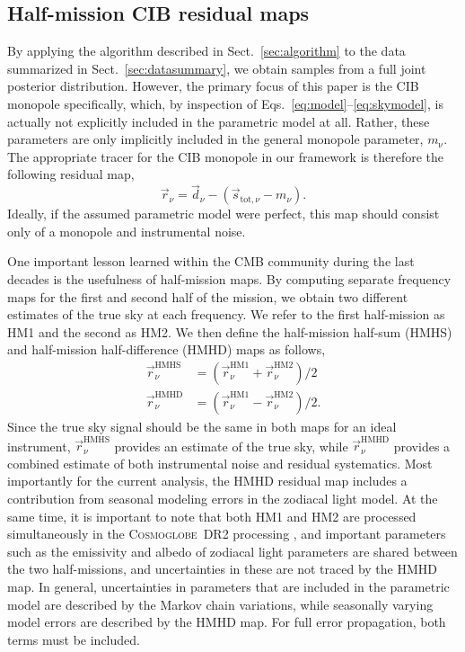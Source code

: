 \documentclass{aa}
\newcommand{\dv}[0]{\vec{d}}
\newcommand{\s}[0]{\vec{s}}
\renewcommand{\r}[0]{\vec{r}}
\newcommand{\cosmoglobe}{\textsc{Cosmoglobe}}
\begin{document}
\subsection{Half-mission CIB residual maps}

By applying the algorithm described in Sect.~\ref{sec:algorithm} to
the data summarized in Sect.~\ref{sec:datasummary}, we obtain samples
from a full joint posterior distribution. However, the primary focus
of this paper is the CIB monopole specifically, which, by inspection
of Eqs.~\eqref{eq:model}--\eqref{eq:skymodel}, is actually not
explicitly included in the parametric model at all. Rather, these
parameters are only implicitly included in the general monopole
parameter, $m_{\mathrm{\nu}}$. The appropriate tracer for the CIB
monopole in our framework is therefore the following residual map,
\begin{equation}
\r_{\nu} = \dv_{\nu} - \left(\s_{\mathrm{tot},\nu} - m_{\nu}\right).
\end{equation}
Ideally, if the assumed parametric model were perfect, this map should
consist only of a monopole and instrumental noise.

One important lesson learned within the CMB community during the last
decades is the usefulness of half-mission maps. By computing separate
frequency maps for the first and second half of the mission, we obtain
two different estimates of the true sky at each frequency. We
refer to the first half-mission as HM1 and the second as HM2. We then
define the half-mission half-sum (HMHS) and half-mission
half-difference (HMHD) maps as follows,
\begin{align}
\r_{\nu}^{\mathrm{HMHS}} &= (\r_{\nu}^{\mathrm{HM1}} + \r_{\nu}^{\mathrm{HM2}})/2\\
\r_{\nu}^{\mathrm{HMHD}} &= (\r_{\nu}^{\mathrm{HM1}} -
\r_{\nu}^{\mathrm{HM2}})/2.
\end{align}
Since the true sky signal should be the same in both maps for an ideal
instrument, $\r_{\nu}^{\mathrm{HMHS}}$ provides an estimate of the
true sky, while $\r_{\nu}^{\mathrm{HMHD}}$ provides a combined
estimate of both instrumental noise and residual systematics. Most
importantly for the current analysis, the HMHD residual map includes a
contribution from seasonal modeling errors in the zodiacal light
model. At the same time, it is important to note that both HM1 and HM2
are processed simultaneously in the \cosmoglobe\ DR2 processing
\citep{CG02_01}, and important parameters such as the emissivity and
albedo of zodiacal light parameters are shared between the two
half-missions, and uncertainties in these are not traced by the HMHD
map. In general, uncertainties in parameters that are included in the
parametric model are described by the Markov chain variations, while
seasonally varying model errors are described by the HMHD map. For
full error propagation, both terms must be included.
\end{document}
